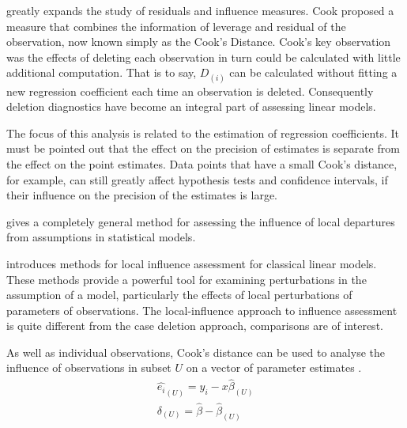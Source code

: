 \documentclass[12pt, a4paper]{report}
\theoremstyle{plain}
\theoremstyle{definition}
\theoremstyle{remark}
\begin{document}
\citet{cook77} greatly expands the study of residuals and influence measures. Cook proposed a measure that combines the information of leverage and residual of the observation, now known simply as the Cook's Distance.
Cook's key observation was the effects of deleting each observation in turn could be calculated with little additional computation. That is to say, $D_{(i)}$ can be calculated without fitting a new regression coefficient each time an observation is deleted. Consequently deletion diagnostics have become an integral part of assessing linear models.

The focus of this analysis is related to the estimation of  regression coefficients. It must be pointed out that the effect on the precision of estimates is separate from the effect on the point estimates. Data points that have a small Cook's distance, for example, can still greatly affect hypothesis tests and confidence intervals, if their 
influence on the precision of the estimates is large.	

\citet{cook86} gives a completely general method for assessing the influence of local departures from assumptions in statistical models.

\citet{cook86} introduces methods for local influence assessment for classical linear models. These methods provide a powerful tool for examining perturbations in the assumption of a model, particularly the effects of local perturbations of parameters of observations. The local-influence approach to influence assessment is quite different from the case deletion approach, comparisons are of interest.








As well as individual observations, Cook's distance can be used to analyse the influence of observations in subset $U$ on a vector of parameter estimates \citep{cook77}.
\begin{eqnarray}
\hat{e_{i}}_{(U)} = y_{i} - x\hat{\beta}_{(U)}\\
\delta_{(U)} = \hat{\beta} - \hat{\beta}_{(U)}
\end{eqnarray}
\end{document}
